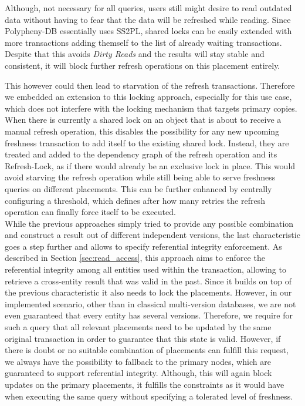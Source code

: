 Although, not necessary for all queries, users still might desire to read outdated data without having to fear that the data will be refreshed while reading.
Since Polypheny-DB essentially uses SS2PL, shared locks can be easily extended with more transactions adding themself to the list of already waiting transactions.
Despite that this avoids \emph{Dirty Reads} and the results will stay stable and consistent, it will block further refresh operations on this placement entirely. 

This however could then lead to starvation of the refresh transactions. 
Therefore we embedded an extension to this locking approach, especially for this use case, which does not interfere with 
the locking mechanism that targets primary copies. When there is currently a shared lock on an object that is about to receive a manual refresh operation, 
this disables the possibility for any new upcoming freshness transaction to add itself to the existing shared lock. Instead, they are treated and added to the dependency graph 
of the refresh operation and its Refresh-Lock, as if there would already be an exclusive lock in place. 
This would avoid starving the refresh operation while still being able to serve freshness queries on different placements.
This can be further enhanced by centrally configuring a threshold, which defines after how many retries the refresh operation can finally force itself 
to be executed.\\
While the previous approaches simply tried to provide any possible combination
and construct a result out of different independent versions, the last characteristic goes a step further and allows to specify referential integrity enforcement. 
As described in Section \ref{sec:read_access}, this approach aims to enforce the referential integrity among all entities used within the transaction, 
allowing to retrieve a cross-entity result that was valid in the past. Since it builds on top of the previous characteristic it also needs to lock the placements. 
However, in our implemented scenario, other than in classical multi-version databases, we are not even guaranteed that every entity has several versions. 
Therefore, we require for such a query that all relevant placements need to be updated by the same original transaction in order to guarantee that this state is valid.
However, if there is doubt or no suitable combination of placements can fulfill this request,
we always have the possibility to fallback to the primary nodes, which are guaranteed to support referential integrity.
Although, this will again block updates on the primary placements, it fulfills the constraints as it would have when executing the same query without specifying a tolerated level of freshness.





